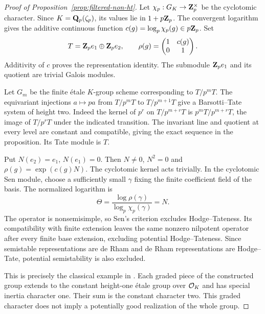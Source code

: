 \begin{proof}[Proof of Proposition~\ref{prop:filtered-non-ht}]
Let $\chi_p:G_K\to\mathbf Z_p^\times$ be the cyclotomic character. Since $K=\mathbf Q_p(\zeta_p)$, its values lie in $1+p\mathbf Z_p$. The convergent logarithm gives the additive continuous function $c(g)=\log_p\chi_p(g)\in p\mathbf Z_p$. Set
\begin{equation}\label{eq:log-cyclotomic-representation}
 T=\mathbf Z_pe_1\oplus\mathbf Z_pe_2,\qquad
 \rho(g)=\begin{pmatrix}1&c(g)\\0&1\end{pmatrix}.
\end{equation}
Additivity of $c$ proves the representation identity. The submodule $\mathbf Z_pe_1$ and its quotient are trivial Galois modules.

Let $G_m$ be the finite \'etale $K$-group scheme corresponding to $T/p^mT$. The equivariant injections $a\mapsto pa$ from $T/p^mT$ to $T/p^{m+1}T$ give a Barsotti--Tate system of height two. Indeed the kernel of $p^r$ on $T/p^{m+r}T$ is $p^mT/p^{m+r}T$, the image of $T/p^rT$ under the indicated transition. The invariant line and quotient at every level are constant and compatible, giving the exact sequence in the proposition. Its Tate module is $T$.

Put $N(e_2)=e_1$, $N(e_1)=0$. Then $N\ne0$, $N^2=0$ and $\rho(g)=\exp(c(g)N)$. The cyclotomic kernel acts trivially. In the cyclotomic Sen module, choose a sufficiently small $\gamma$ fixing the finite coefficient field of the basis. The normalized logarithm is
\[
               \Theta=\frac{\log\rho(\gamma)}{\log_p\chi_p(\gamma)}=N.
\]
The operator is nonsemisimple, so Sen's criterion excludes Hodge--Tateness. Its compatibility with finite extension leaves the same nonzero nilpotent operator after every finite base extension, excluding potential Hodge--Tateness. Since semistable representations are de Rham and de Rham representations are Hodge--Tate, potential semistability is also excluded.

This is precisely the classical example in \citet[Section~II.1.2, p.~9 of the 2002 author version]{Berger2004}. Each graded piece of the constructed group extends to the constant height-one \'etale group over $\mathcal O_K$ and has special inertia character one. Their sum is the constant character two. This graded character does not imply a potentially good realization of the whole group.
\end{proof}

